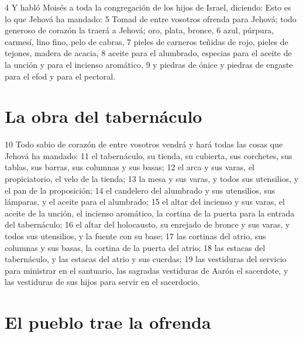 4 Y habló Moisés a toda la congregación de los hijos de Israel, diciendo: Esto es lo que Jehová ha mandado:
5 Tomad de entre vosotros ofrenda para Jehová; todo generoso de corazón la traerá a Jehová; oro, plata, bronce,
6 azul, púrpura, carmesí, lino fino, pelo de cabras,
7 pieles de carneros teñidas de rojo, pieles de tejones, madera de acacia,
8 aceite para el alumbrado, especias para el aceite de la unción y para el incienso aromático,
9 y piedras de ónice y piedras de engaste para el efod y para el pectoral.

\section*{La obra del tabernáculo}

10 Todo sabio de corazón de entre vosotros vendrá y hará todas las cosas que Jehová ha mandado:
11 el tabernáculo, su tienda, su cubierta, sus corchetes, sus tablas, sus barras, sus columnas y sus basas;
12 el arca y sus varas, el propiciatorio, el velo de la tienda;
13 la mesa y sus varas, y todos sus utensilios, y el pan de la proposición;
14 el candelero del alumbrado y sus utensilios, sus lámparas, y el aceite para el alumbrado;
15 el altar del incienso y sus varas, el aceite de la unción, el incienso aromático, la cortina de la puerta para la entrada del tabernáculo;
16 el altar del holocausto, su enrejado de bronce y sus varas, y todos sus utensilios, y la fuente con su base;
17 las cortinas del atrio, sus columnas y sus basas, la cortina de la puerta del atrio;
18 las estacas del tabernáculo, y las estacas del atrio y sus cuerdas;
19 las vestiduras del servicio para ministrar en el santuario, las sagradas vestiduras de Aarón el sacerdote, y las vestiduras de sus hijos para servir en el sacerdocio.

\section*{El pueblo trae la ofrenda}

